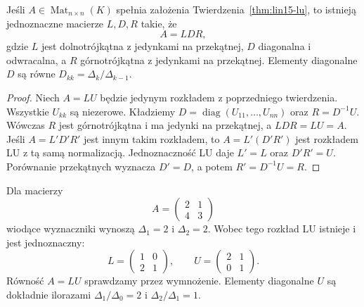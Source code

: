 \begin{wniosek}
\label{cor:lin15-ldu}
Jeśli \(A\in\operatorname{Mat}_{n\times n}(K)\)
spełnia założenia
Twierdzenia~\ref{thm:lin15-lu},
to istnieją jednoznaczne macierze
\(L,D,R\) takie, że
\[
 A=LDR,
\]
gdzie \(L\) jest dolnotrójkątna
z jedynkami na przekątnej,
\(D\) diagonalna i odwracalna,
a \(R\) górnotrójkątna
z jedynkami na przekątnej.
Elementy diagonalne \(D\)
są równe
\(D_{kk}=\Delta_k/\Delta_{k-1}\).
\end{wniosek}
\begin{proof}
Niech \(A=LU\) będzie jedynym
rozkładem z poprzedniego twierdzenia.
Wszystkie \(U_{kk}\) są niezerowe.
Kładziemy
\(D=\operatorname{diag}(U_{11},\ldots,U_{nn})\)
oraz \(R=D^{-1}U\).
Wówczas \(R\) jest górnotrójkątna
i ma jedynki na przekątnej,
a \(LDR=LU=A\).
Jeśli \(A=L'D'R'\) jest innym
takim rozkładem, to
\(A=L'(D'R')\) jest rozkładem LU
z tą samą normalizacją.
Jednoznaczność LU daje
\(L'=L\) oraz \(D'R'=U\).
Porównanie przekątnych
wyznacza \(D'=D\), a potem
\(R'=D^{-1}U=R\).
\end{proof}

\begin{przyklad}
\label{prz:lin15-lu}
Dla macierzy
\[
 A=\begin{pmatrix}2&1\\4&3\end{pmatrix}
\]
wiodące wyznaczniki wynoszą
\(\Delta_1=2\) i \(\Delta_2=2\).
Wobec tego rozkład LU
istnieje i jest jednoznaczny:
\[
 L=\begin{pmatrix}1&0\\2&1\end{pmatrix},
 \qquad
 U=\begin{pmatrix}2&1\\0&1\end{pmatrix}.
\]
Równość \(A=LU\)
sprawdzamy przez wymnożenie.
Elementy diagonalne \(U\)
są dokładnie ilorazami
\(\Delta_1/\Delta_0=2\)
i \(\Delta_2/\Delta_1=1\).
\end{przyklad}


